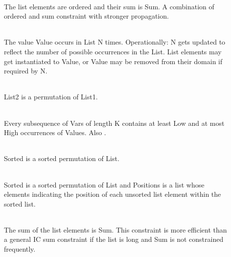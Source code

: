 \begin{description}
\item[]\ \\
The list elements are ordered and their sum is Sum.  A combination of
ordered and sum constraint with stronger propagation.

\item[]\ \\
The value Value occurs in List N times.
Operationally: N gets updated to reflect the number of
possible occurrences in the List. List elements may get
instantiated to Value, or Value may be removed from their
domain if required by N.

\item[]\ \\
List2 is a permutation of List1.

\item[]\ \\
Every subsequence of Vars of length K contains at least Low and at most High
occurrences of Values.
Also .

\item[]\ \\
Sorted is a sorted permutation of List.

\item[]\ \\
Sorted is a sorted permutation of List and Positions is a list whose
elements indicating the position of each unsorted list element within
the sorted list.

\item[]\ \\
The sum of the list elements is Sum. This constraint
is more efficient than a general IC sum constraint
if the list is long and Sum is not constrained frequently.

\end{description}


